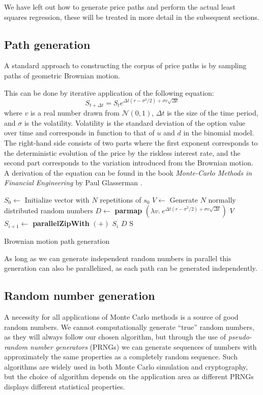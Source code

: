 We have left out how to generate price paths and perform the actual
least squares regression, these will be treated in more detail in the
subsequent sections.

\subsection{Path generation}
A standard approach to constructing the corpus of price paths is by
sampling paths of geometric Brownian motion.

This can be done by iterative application of the following equation:
$$S_{t+\Delta t}=S_te^{\Delta t(r-\sigma^2/2) + \sigma v\sqrt{\Delta t}}$$ where 
$v$ is a real number drawn from $\mathcal{N}(0,1)$, $\Delta t$ is the
size of the time period, and $\sigma$ is the volatility. Volatility is
the standard deviation of the option value over time and corresponds
in function to that of $u$ and $d$ in the binomial model. The
right-hand side consists of two parts where the first exponent
corresponds to the deterministic evolution of the price by the
riskless interest rate, and the second part corresponds to the
variation introduced from the Brownian motion. A derivation of the
equation can be found in the book \emph{Monte-Carlo Methods in
  Financial Engineering} by Paul Glasserman \cite[Section
3.2]{glasserman2003monte}.

\begin{algorithm}
  \begin{algorithmic}
    \State $S_0 \gets$ Initialize vector with $N$ repetitions of $s_0$
      \State $V \gets$ Generate $N$ normally distributed random numbers
      \State $D \gets$ \textbf{parmap} $(\lambda v.\ e^{\Delta t(r-\sigma^2/2) + \sigma v\sqrt{\Delta t}})$ $V$
      \State $S_{i+1} \gets$ \textbf{parallelZipWith} $(+)$ $S_{i}$ $D$
    \EndFor
    \State \Return S
    \EndFunction
  \end{algorithmic}
  \caption{Brownian motion path generation}
  \label{alg:lsm-pathgeneration}
\end{algorithm}


As long as we can generate independent random numbers in parallel this
generation can also be parallelized, as each path can be generated
independently.

\subsection{Random number generation}
A necessity for all applications of Monte Carlo methods is a source of
good random numbers. We cannot computationally generate ``true'' random
numbers, as they will always follow our chosen algorithm, but through
the use of \emph{pseudo-random number generators} (PRNGs) we can
generate sequences of numbers with approximately the same properties
as a completely random sequence. Such algorithms are widely used in both
Monte Carlo simulation and cryptography, but the choice of algorithm
depends on the application area as different PRNGs displays different
statistical properties.

